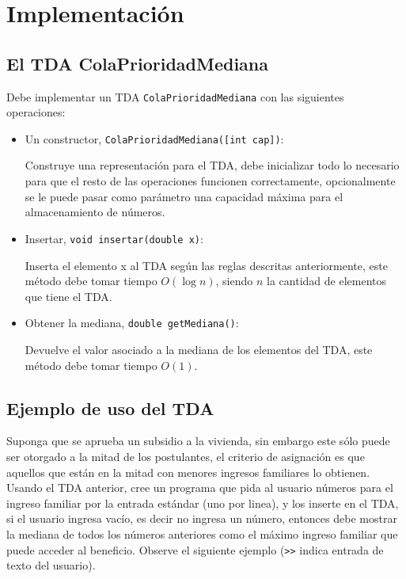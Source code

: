 \documentclass[dcc]{fcfmcourse}
\begin{document}
\newpage
\section{Implementación}
\subsection{El TDA ColaPrioridadMediana}
Debe implementar un TDA \texttt{ColaPrioridadMediana} con las siguientes operaciones:

\begin{itemize}

\item Un constructor, \texttt{ColaPrioridadMediana([int cap])}: 

Construye una representación para el TDA, debe inicializar todo lo necesario para que el resto de las operaciones funcionen correctamente, opcionalmente se le puede pasar como parámetro una capacidad máxima para el almacenamiento de números. \\

\item Insertar, \texttt{void insertar(double x)}:

Inserta el elemento x al TDA según las reglas descritas anteriormente, este método debe tomar tiempo $O(\log{n})$, siendo $n$ la cantidad de elementos que tiene el TDA. \\

\item Obtener la mediana, \texttt{double getMediana()}:

Devuelve el valor asociado a la mediana de los elementos del TDA, este método debe tomar tiempo $O(1)$. \\


\end{itemize}


\subsection{Ejemplo de uso del TDA}
Suponga que se aprueba un subsidio a la vivienda, sin embargo este sólo puede ser otorgado a la mitad de los postulantes, el criterio de asignación es que aquellos que están en la mitad con menores ingresos familiares lo obtienen. Usando el TDA anterior, cree un programa que pida al usuario números para el ingreso familiar por la entrada estándar (uno por linea), y los inserte en el TDA, si el usuario ingresa vacío, es decir no ingresa un  número, entonces debe mostrar la mediana de todos los números anteriores como el máximo ingreso familiar que puede acceder al beneficio. Observe el siguiente ejemplo (\texttt{>>} indica entrada de texto del usuario).
\end{document}
